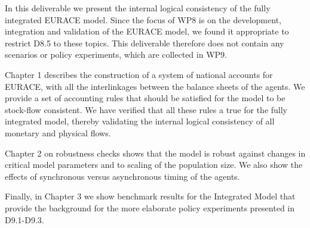 In this deliverable we present the internal logical consistency of the fully integrated EURACE model.
Since the focus of WP8 is on the development, integration and validation of the EURACE model, we found it appropriate to restrict D8.5 to these topics. This deliverable therefore does not contain any scenarios or policy experiments, which are collected in WP9.

Chapter 1 describes the construction of a system of national accounts for EURACE, with all the interlinkages between the balance sheets of the agents. We provide a set of accounting rules that should be satisfied for the model to be stock-flow consistent. We have verified that all these rules a true for the fully integrated model, thereby validating the internal logical consistency of all monetary and physical flows.

Chapter 2 on robustness checks shows that the model is robust against changes in critical model parameters and to scaling of the population size. We also show the effects of synchronous versus asynchronous timing of the agents.

Finally, in Chapter 3 we show benchmark results for the Integrated Model that provide the background for the more elaborate policy experiments presented in D9.1-D9.3. 